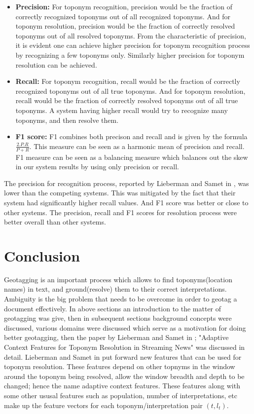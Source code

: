 \documentclass[
     11pt,         %
     a4paper,      %
     oneside,
     ]{article}
\begin{document}
\begin{itemize}[leftmargin=*]
	\item[] \textbf{Precision:} For toponym recognition, precision would be the fraction of correctly recognized toponyms out of all recognized toponyms. And for toponym resolution, precision would be the fraction of correctly resolved toponyms out of all resolved toponyms.  From the characteristic of precision, it is evident one can achieve higher precision for toponym recognition process by recognizing a few toponyms only. Similarly higher precision for toponym resolution can be achieved.  
	\item[] \textbf{Recall:} For toponym recognition, recall would be the fraction of correctly recognized toponyms out of all true toponyms. And for toponym resolution, recall would be the fraction of correctly resolved toponyms out of all true toponyms. A system having higher recall would try to recognize many toponyms, and then resolve them. 
	\item[] \textbf{F1 score:} F1 combines both precison and recall and is given by the formula $\frac{2.P.R}{P+R}$. This measure can be seen as a harmonic mean of precision and recall. F1 measure can be seen as a balancing measure which balances out the skew in our system results by using only precision or recall.
\end{itemize}
The precision for recognition process, reported by Lieberman and Samet in \cite{Lieberman12adaptivecontext}, was lower than the competing systems. This was mitigated by the fact that their system had significantly higher recall values. And F1 score was better or close to other systems. The precision, recall and F1 scores for resolution process were better overall than other systems.


\section{Conclusion}\label{sec:conclusion}
Geotagging is an important process which allows to find toponyms(location names) in text, and ground(resolve) them to their correct interpretations. Ambiguity is the big problem that needs to be overcome in order to geotag a document effectively. In above sections an introduction to the matter of geotagging was give, then in subsequent sections background concepts were discussed, various domains were discussed which serve as a motivation for doing better geotagging, then the paper by Lieberman and Samet in \cite{Lieberman12adaptivecontext}; "Adaptive Context Features for Toponym Resolution in Streaming News" was discussed in detail. Lieberman and Samet in \cite{Lieberman12adaptivecontext} put forward new features that can be used for toponym resolution. These features depend on other topnyms in the window around the toponym being resolved, allow the window breadth and depth to be changed; hence the name adaptive context features. These features along with some other ususal features such as population, number of interpretations, etc make up the feature vectors for each toponym/interpretation pair $(t, l_t)$.
\end{document}

